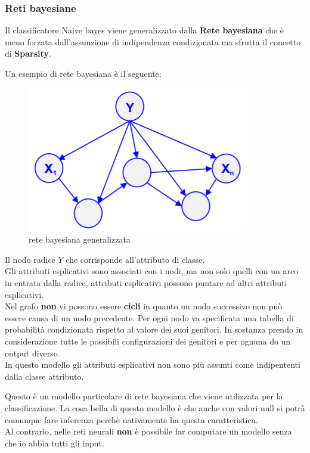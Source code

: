 \subsubsection{Reti bayesiane}
Il classificatore Naive bayes viene generalizzato dalla \textbf{Rete bayesiana} che \`e meno forzata dall'assunzione di indipendenza condizionata ma sfrutta il concetto di \textbf{Sparsity}. 

Un esempio di rete bayesiana è il seguente:

\begin{figure}[H]
	\centering
	\includegraphics[height=0.35 \linewidth]{classification/pict/networkbayes.png}
	\caption{rete bayesiana generalizzata}
\end{figure}

Il nodo radice $Y$ che corrisponde all'attributo di classe.\\

Gli attributi esplicativi sono associati con i nodi, ma non solo quelli con un arco in entrata dalla radice, attributi esplicativi possono puntare ad altri attributi esplicativi.\\

Nel grafo \textbf{non} vi possono essere \textbf{cicli} in quanto un nodo successivo non pu\`o essere causa di un nodo precedente. Per ogni nodo va specificata una tabella di probabilità condizionata rispetto al valore dei suoi genitori. In sostanza prendo in considerazione tutte le possibili configurazioni dei genitori e per ognuna do un output diverso. \\

In questo modello gli attributi esplicativi non sono più assunti come indipententi dalla classe attributo.

Questo è un modello particolare di rete bayesiana che viene utilizzata per la classificazione. La cosa bella di questo modello \`e che anche con valori null si potrà comunque fare inferenza perchè nativamente ha questa caratteristica. \\

Al contrario, nelle reti neurali \textbf{non} \`e possibile far computare un modello senza che io abbia tutti gli input. 
\\
